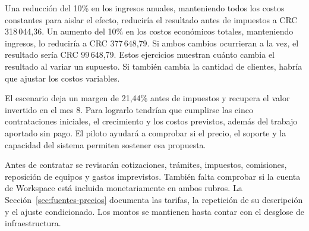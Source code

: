 Una reducción del 10\% en los ingresos anuales, manteniendo todos los costos
constantes para aislar el efecto, reduciría el resultado antes de impuestos a
CRC 318\,044,36. Un aumento del 10\% en los costos económicos totales, manteniendo
ingresos, lo reduciría a CRC 377\,648,79. Si ambos cambios ocurrieran a la vez,
el resultado sería CRC 99\,648,79. Estos ejercicios muestran cuánto cambia el
resultado al variar un supuesto. Si también cambia la cantidad de clientes,
habría que ajustar los costos variables.

El escenario deja un margen de 21,44\% antes de impuestos y recupera el valor
invertido en el mes 8. Para lograrlo tendrían que cumplirse las cinco
contrataciones iniciales, el crecimiento y los costos previstos, además del
trabajo aportado sin pago. El piloto ayudará a comprobar si el precio, el
soporte y la capacidad del sistema permiten sostener esa propuesta.

Antes de contratar se revisarán cotizaciones, trámites, impuestos, comisiones,
reposición de equipos y gastos imprevistos. También falta comprobar si
la cuenta de Workspace está incluida monetariamente en ambos rubros. La
Sección~\ref{sec:fuentes-precios} documenta las tarifas, la repetición de su
descripción y el ajuste condicionado. Los montos se mantienen hasta contar
con el desglose de infraestructura.
